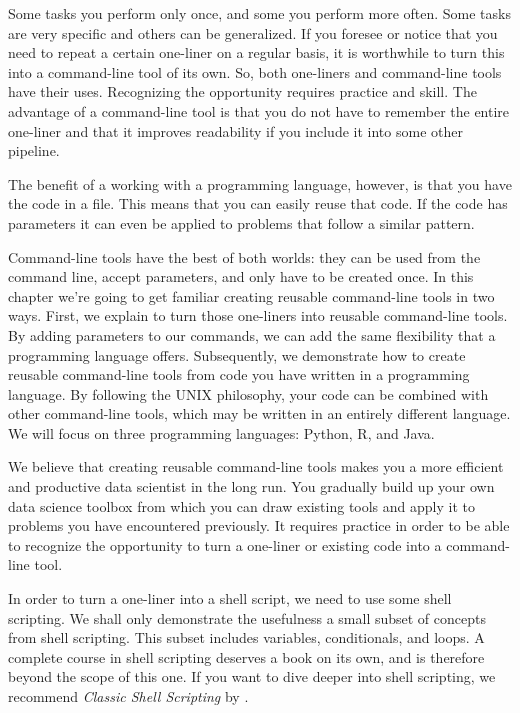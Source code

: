 \documentclass[
]{book}
\theoremstyle{definition}
\theoremstyle{definition}
\theoremstyle{definition}
\theoremstyle{remark}
\begin{document}
Some tasks you perform only once, and some you perform more often. Some tasks are very specific and others can be generalized. If you foresee or notice that you need to repeat a certain one-liner on a regular basis, it is worthwhile to turn this into a command-line tool of its own. So, both one-liners and command-line tools have their uses. Recognizing the opportunity requires practice and skill. The advantage of a command-line tool is that you do not have to remember the entire one-liner and that it improves readability if you include it into some other pipeline.

The benefit of a working with a programming language, however, is that you have the code in a file. This means that you can easily reuse that code. If the code has parameters it can even be applied to problems that follow a similar pattern.

Command-line tools have the best of both worlds: they can be used from the command line, accept parameters, and only have to be created once. In this chapter we're going to get familiar creating reusable command-line tools in two ways. First, we explain to turn those one-liners into reusable command-line tools. By adding parameters to our commands, we can add the same flexibility that a programming language offers. Subsequently, we demonstrate how to create reusable command-line tools from code you have written in a programming language. By following the UNIX philosophy, your code can be combined with other command-line tools, which may be written in an entirely different language. We will focus on three programming languages: Python, R, and Java.

We believe that creating reusable command-line tools makes you a more efficient and productive data scientist in the long run. You gradually build up your own data science toolbox from which you can draw existing tools and apply it to problems you have encountered previously. It requires practice in order to be able to recognize the opportunity to turn a one-liner or existing code into a command-line tool.

In order to turn a one-liner into a shell script, we need to use some shell scripting. We shall only demonstrate the usefulness a small subset of concepts from shell scripting. This subset includes variables, conditionals, and loops. A complete course in shell scripting deserves a book on its own, and is therefore beyond the scope of this one. If you want to dive deeper into shell scripting, we recommend \emph{Classic Shell Scripting} by \citet{Robbins2005}.
\end{document}
